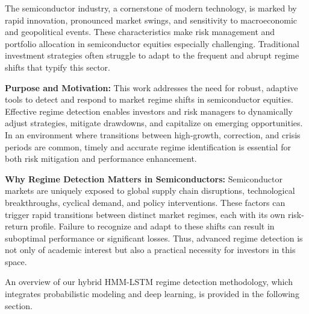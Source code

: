 The semiconductor industry, a cornerstone of modern technology, is marked by rapid innovation, pronounced market swings, and sensitivity to macroeconomic and geopolitical events. These characteristics make risk management and portfolio allocation in semiconductor equities especially challenging. Traditional investment strategies often struggle to adapt to the frequent and abrupt regime shifts that typify this sector.

\textbf{Purpose and Motivation:} This work addresses the need for robust, adaptive tools to detect and respond to market regime shifts in semiconductor equities. Effective regime detection enables investors and risk managers to dynamically adjust strategies, mitigate drawdowns, and capitalize on emerging opportunities. In an environment where transitions between high-growth, correction, and crisis periods are common, timely and accurate regime identification is essential for both risk mitigation and performance enhancement.

\textbf{Why Regime Detection Matters in Semiconductors:} Semiconductor markets are uniquely exposed to global supply chain disruptions, technological breakthroughs, cyclical demand, and policy interventions. These factors can trigger rapid transitions between distinct market regimes, each with its own risk-return profile. Failure to recognize and adapt to these shifts can result in suboptimal performance or significant losses. Thus, advanced regime detection is not only of academic interest but also a practical necessity for investors in this space.

An overview of our hybrid HMM-LSTM regime detection methodology, which integrates probabilistic modeling and deep learning, is provided in the following section.
